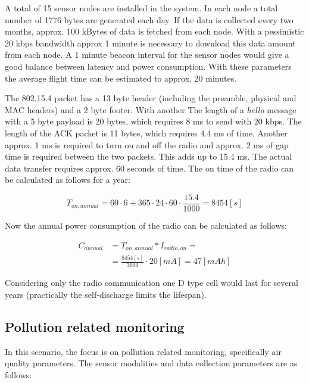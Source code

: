 \documentclass[conference]{IEEEtran}
\begin{document}
A total of 15 sensor nodes are installed in the system.
In each node a total number of 1776 bytes are generated each day.
If the data is collected every two months, approx.
100 kBytes of data is fetched from each node. With a
pessimistic 20 kbps bandwidth approx 1 minute is
necessary to download this data amount from each node.
A 1 minute beacon interval for the sensor nodes would
give a good balance between latency and power
consumption. With these parameters the average flight
time can be estimated to approx. 20 minutes.

The 802.15.4 packet has a 13 byte header (including the preamble,
physical and MAC headers) and a 2 byte footer. With another
The length of a \emph{hello} message with a 5 byte payload is
20 bytes, which requires 8 ms to send with 20 kbps. The length of
the ACK packet is 11 bytes, which requires 4.4 ms of time.
Another approx. 1
ms is required to turn on and off the radio and approx. 2 ms
of gap time is required between the two packets. This adds up
to 15.4 ms. 
The actual data transfer requires approx. 60 seconds of time.
The on time of the radio can be calculated as follows for a year:

\begin{equation}
    T_{on,annual} = 60 \cdot 6 + 365 \cdot 24 \cdot 60 \cdot \frac{15.4}{1000} = 8454 [s]
\end{equation}

Now the annual power consumption of the radio can be calculated as
follows:

\begin{align}
    C_{annual} &= T_{on,annual} * I_{radio,on} = \\
     &= \frac{8454 [s]}{3600} \cdot 20 [mA] = 47 [mAh]
\end{align}

Considering only the radio communication one D type cell would last for
several years (practically the self-discharge limits the lifespan).

\subsection{Pollution related monitoring}

In this scenario, the focus is on pollution related monitoring, specifically
air quality parameters. The sensor modalities and data
collection parameters are as follows:
\end{document}
